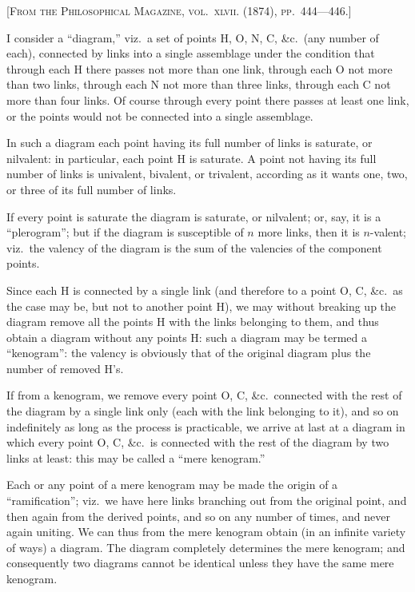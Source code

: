 \documentclass[11pt,a4paper]{article}
\theoremstyle{plain}
\theoremstyle{definition}
\theoremstyle{remark}
\begin{document}
\noindent\textsc{[From the Philosophical Magazine, vol.~\textsc{xlvii}. (1874), pp.~444---446.]}

\medskip

\noindent I consider a ``diagram,'' viz.\ a set of points H, O, N, C, \&c.\ (any number of each), connected by links into a single assemblage under the condition that through each H there passes not more than one link, through each O not more than two links, through each N not more than three links, through each C not more than four links. Of course through every point there passes at least one link, or the points would not be connected into a single assemblage.

In such a diagram each point having its full number of links is saturate, or nilvalent: in particular, each point H is saturate. A point not having its full number of links is univalent, bivalent, or trivalent, according as it wants one, two, or three of its full number of links.

If every point is saturate the diagram is saturate, or nilvalent; or, say, it is a ``plerogram''; but if the diagram is susceptible of $n$ more links, then it is $n$-valent; viz.\ the valency of the diagram is the sum of the valencies of the component points.

Since each H is connected by a single link (and therefore to a point O, C, \&c.\ as the case may be, but not to another point H), we may without breaking up the diagram remove all the points H with the links belonging to them, and thus obtain a diagram without any points H: such a diagram may be termed a ``kenogram'': the valency is obviously that of the original diagram plus the number of removed H's.

If from a kenogram, we remove every point O, C, \&c.\ connected with the rest of the diagram by a single link only (each with the link belonging to it), and so on indefinitely as long as the process is practicable, we arrive at last at a diagram in which every point O, C, \&c.\ is connected with the rest of the diagram by two links at least: this may be called a ``mere kenogram.''

Each or any point of a mere kenogram may be made the origin of a ``ramification''; viz.\ we have here links branching out from the original point, and then again from the derived points, and so on any number of times, and never again uniting. We can thus from the mere kenogram obtain (in an infinite variety of ways) a diagram. The diagram completely determines the mere kenogram; and consequently two diagrams cannot be identical unless they have the same mere kenogram.
\end{document}
